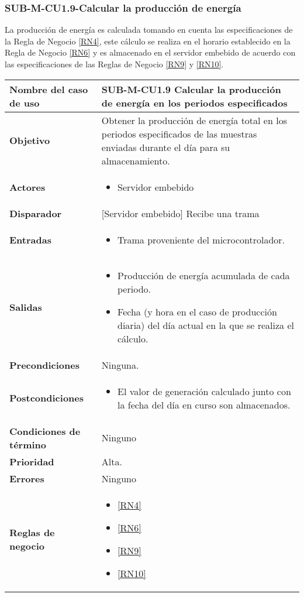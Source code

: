 \subsubsection{SUB-M-CU1.9-Calcular la producción de energía}\label{SUB-M-CU1.9}
La producción de energía es calculada tomando en cuenta las especificaciones de la Regla de Negocio \ref{RN4}, este cálculo se realiza en el horario establecido en la Regla de Negocio \ref{RN6} y es almacenado en el servidor embebido de acuerdo con las especificaciones de las Reglas de Negocio \ref{RN9} y \ref{RN10}.

\begin{longtable}{|J{5cm}|J{10.3cm}|}
	\hline
	\textbf{Nombre del caso de uso} &
		SUB-M-CU1.9 Calcular la producción de energía en los periodos especificados\\ \hline
	\textbf{Objetivo} &
		Obtener la producción de energía total en los periodos especificados de las muestras enviadas durante el día para su almacenamiento. \\ \hline
	\textbf{Actores} &
		\begin{itemize}
		    \item Servidor embebido
		\end{itemize}\\ \hline 
	\textbf{Disparador} & 
	     {[Servidor embebido]} Recibe una trama\\ \hline 
	\textbf{Entradas} & 
		\begin{itemize}
				\item Trama proveniente del microcontrolador.
		\end{itemize}\\ \hline 
	\textbf{Salidas} & 
		\begin{itemize}
			\item Producción de energía acumulada de cada periodo.
			\item Fecha (y hora en el caso de producción diaria) del día actual en la que se realiza el cálculo.
		\end{itemize} \\ \hline
	\textbf{Precondiciones} &
		Ninguna.\\ \hline
	\textbf{Postcondiciones} &
		\begin{itemize}
			\item El valor de generación calculado junto con la fecha del día en curso son almacenados.
		\end{itemize}\\ \hline
	\textbf{Condiciones de término} & 
		Ninguno \\ \hline 
	\textbf{Prioridad} & 
		Alta. \\ \hline
	\textbf{Errores} & 
	    Ninguno
		\\ \hline
	\textbf{Reglas de negocio} & 
		\begin{itemize}
			\item \ref{RN4}
			\item \ref{RN6}
			\item \ref{RN9}
			\item \ref{RN10}
		\end{itemize} \\ \hline


\end{longtable}
